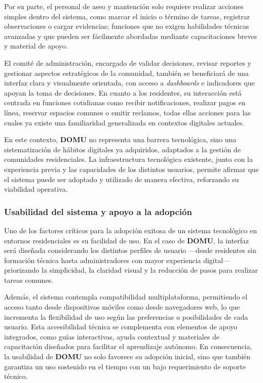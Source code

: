 Por su parte, el personal de aseo y mantención solo requiere realizar acciones simples dentro del sistema, como marcar el inicio o término de tareas, registrar observaciones o cargar evidencias; funciones que no exigen habilidades técnicas avanzadas y que pueden ser fácilmente abordadas mediante capacitaciones breves y material de apoyo.

El comité de administración, encargado de validar decisiones, revisar reportes y gestionar aspectos estratégicos de la comunidad, también se beneficiará de una interfaz clara y visualmente orientada, con acceso a \textit{dashboards} e indicadores que apoyan la toma de decisiones. En cuanto a los residentes, su interacción está centrada en funciones cotidianas como recibir notificaciones, realizar pagos en línea, reservar espacios comunes o emitir reclamos, todas ellas acciones para las cuales ya existe una familiaridad generalizada en contextos digitales actuales.

En este contexto, \textbf{DOMU} no representa una barrera tecnológica, sino una sistematización de hábitos digitales ya adquiridos, adaptados a la gestión de comunidades residenciales. La infraestructura tecnológica existente, junto con la experiencia previa y las capacidades de los distintos usuarios, permite afirmar que el sistema puede ser adoptado y utilizado de manera efectiva, reforzando su viabilidad operativa.

\subsubsection{Usabilidad del sistema y apoyo a la adopción}

Uno de los factores críticos para la adopción exitosa de un sistema tecnológico en entornos residenciales es su facilidad de uso. En el caso de \textbf{DOMU}, la interfaz será diseñada considerando los distintos perfiles de usuario —desde residentes sin formación técnica hasta administradores con mayor experiencia digital— priorizando la simplicidad, la claridad visual y la reducción de pasos para realizar tareas comunes. 

Además, el sistema contempla compatibilidad multiplataforma, permitiendo el acceso tanto desde dispositivos móviles como desde navegadores web, lo que incrementa la flexibilidad de uso según las preferencias o posibilidades de cada usuario. Esta accesibilidad técnica se complementa con elementos de apoyo integrados, como guías interactivas, ayuda contextual y materiales de capacitación diseñados para facilitar el aprendizaje autónomo. En consecuencia, la usabilidad de \textbf{DOMU} no solo favorece su adopción inicial, sino que también garantiza un uso sostenido en el tiempo con un bajo requerimiento de soporte técnico.

